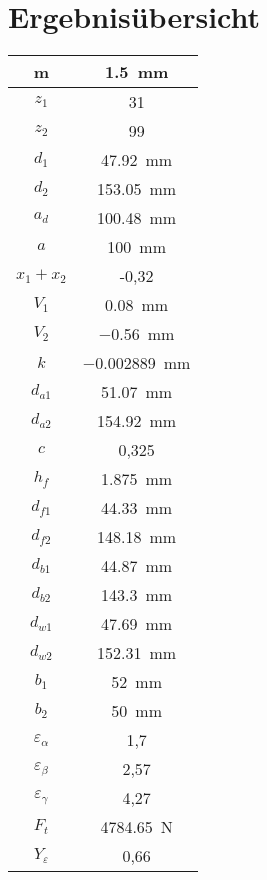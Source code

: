 \documentclass[15pt,a4paper]{article}
\begin{document}
     \section{Ergebnisübersicht}
     	\begin{table}[!hbpt]
     	\centering
     	\begin{tabular}{c|c}
     		m & \SI{1,5}{\milli\metre} \\\hline
     		$z_1$ & 31 \\\hline
     		$z_2$ & 99 \\\hline
     		$d_1$ & \SI{47,92}{\milli\metre} \\\hline
     		$d_2$ &  \SI{153,05}{\milli\metre}\\\hline
     		$a_d$ & \SI{100,48}{\milli\metre} \\\hline
     		$a$ &\SI{100}{\milli\metre} \\\hline
     		$x_1 + x_2$ &  -0,32\\\hline
     		$V_1$ & \SI{0,08}{\milli\m} \\\hline
     		$V_2$ & \SI{-0,56}{\milli\m} \\\hline
     		$k$ & \SI{-0,002889}{\milli\m}\\\hline
     		$d_{a1}$ & \SI{51,07}{\milli\m} \\\hline
     		$d_{a2}$ & \SI{154,92}{\milli\m} \\\hline
     		$c$&0,325\\\hline
     		$h_f$ &\SI{1,875}{\milli\m}\\\hline
     		$d_{f1}$&  \SI{44,33}{\milli\m} \\\hline
     		$d_{f2}$& \SI{148,18}{\milli\m} \\\hline
     		$d_{b1}$& \SI{44,87}{\milli\m}\\\hline
     		$d_{b2}$& \SI{143,3}{\milli\m} \\\hline
     		$d_{w1}$& \SI{47,69}{\milli\m}\\\hline
     		$d_{w2}$&   \SI{152,31}{\milli\m}\\\hline
     		$b_1$ & \SI{52}{\milli\m}\\\hline
     		$b_2$ &  \SI{50}{\milli\m}\\\hline
     		$\varepsilon_{\alpha}$ & 1,7 \\\hline
     		$\varepsilon_{\beta}$ & 2,57\\\hline
     		$\varepsilon_{\gamma}$ & 4,27\\\hline
     		$F_t$ & \SI{4784,65}{\newton}  \\\hline
     		$Y_\varepsilon$ &0,66 \\\hline

\end{tabular}
\end{table}
\end{document}
